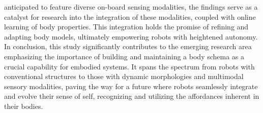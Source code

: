 anticipated to feature diverse on-board sensing modalities, the findings serve as a catalyst for research into the integration of these modalities, coupled with online learning of body properties. This integration holds the promise of refining and adapting body models, ultimately empowering robots with heightened autonomy. In conclusion, this study significantly contributes to the emerging research area emphasizing the importance of building and maintaining a body schema as a crucial capability for embodied systems. It spans the spectrum from robots with conventional structures to those with dynamic morphologies and multimodal sensory modalities, paving the way for a future where robots seamlessly integrate and evolve their sense of self, recognizing and utilizing the affordances inherent in their bodies.



